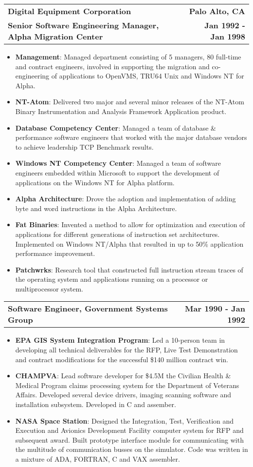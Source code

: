 \documentclass[letterpaper,10pt, sans]{article}
\makeatletter
\newcommand{\resumeCompanyHeading}[4]{
  \vspace{-1pt}
    \item
    \begin{tabular*}{1.0\textwidth}[t]{l@{\extracolsep{\fill}}r}
      \textbf{#1} & \textbf{#2} \\
      \textbf{#3} & \textbf{#4}
    \end{tabular*}\vspace{-1pt}
  }
\newcommand{\resumeCompanyPositionHeading}[2]{
    \vspace{-1pt}
      \item
      \begin{tabular*}{1.0\textwidth}{l@{\extracolsep{\fill}}r}
        \textbf{#1} & \textbf{#2}
    \end{tabular*}\vspace{-1pt}
}
\newcommand{\resumeItem}[2]{\item{{\textbf{#1}}: {#2 \vspace{1pt}}}}
\newcommand{\resumeItemListStart}{\begin{itemize}}\vspace{-1pt}
\newcommand{\resumeItemListEnd}{\end{itemize}}\vspace{-1pt}
\makeatother
\begin{document}
        \resumeCompanyHeading
          {Digital Equipment Corporation}{Palo Alto, CA}
          {Senior Software Engineering Manager, Alpha Migration Center}{Jan 1992 - Jan 1998}
                 \resumeItemListStart
                 \resumeItem{Management}{Managed department consisting of 5 managers, 80 full-time and contract engineers, involved in supporting the migration and
                                        co-engineering of applications to OpenVMS, TRU64 Unix and Windows NT for Alpha.}
                 \resumeItem{NT-Atom}{Delivered two major and several minor releases of the NT-Atom Binary Instrumentation
                             and Analysis Framework Application product.}
                \resumeItem{Database Competency Center}{Managed a team of database \& performance software engineers that worked with 
                            the major database vendors to achieve leadership TCP Benchmark results.}
                \resumeItem{Windows NT Competency Center}{Managed a team of software engineers embedded within Microsoft to support the development of applications
                            on the Windows NT for Alpha platform.}
                \resumeItem{Alpha Architecture}{Drove the adoption and implementation of adding byte and word instructions in the Alpha Architecture.}
                \resumeItem{Fat Binaries}{Invented a method to allow for optimization and execution of applications for different generations 
                            of instruction set architectures.  Implemented on Windows NT/Alpha that resulted in up to 50\% application performance improvement.}
                \resumeItem{Patchwrks}{Research tool that constructed full instruction stream traces of the operating system and applications running on a processor 
                            or multiprocessor system.}
            \resumeItemListEnd

        \resumeCompanyPositionHeading
          {Software Engineer, Government Systems Group}{Mar 1990 - Jan 1992}
          \resumeItemListStart
            \resumeItem{EPA GIS System Integration Program}{Led a 10-person team in developing all technical deliverables for the RFP, Live Test Demonstration and contract
              modifications for the successful \$140 million contract win.}
            \resumeItem{CHAMPVA}{Lead software developer for \$4.5M the Civilian Health \& Medical Program claims processing system for the 
              Department of Veterans Affairs.  Developed several device drivers, imaging scanning software and installation subsystem.  Developed in C and assember.}
            \resumeItem{NASA Space Station}{Designed the Integration, Test, Verification and Execution and Avionics Development Facility computer system for 
              RFP and subsequent award. Built  prototype interface module for communicating with the multitude of communication busses on the simulator. 
              Code was written in a mixture of ADA, FORTRAN, C and VAX assembler.}
          \resumeItemListEnd
    
\end{document}
